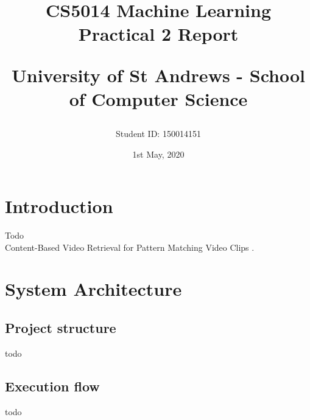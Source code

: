 \documentclass[letterpaper,12pt]{article}
\begin{document}
\title{
    CS5014 Machine Learning\\Practical 2 Report\\
    \begin{large}
    University of St Andrews - School of Computer Science
    \end{large}
}
\author{Student ID: 150014151}
\date{1st May, 2020}
\maketitle
\newpage

\tableofcontents
\newpage


\section{Introduction}
\label{sec:introduction}

Todo\\

Content-Based Video Retrieval for Pattern Matching Video Clips \cite{Jaamour2019}.


\section{System Architecture}
\label{sec:system-architecture}

\subsection{Project structure}

todo

\subsection{Execution flow}

todo
\end{document}
